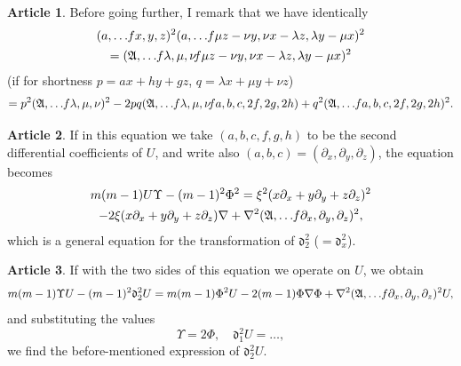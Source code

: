\documentclass[12pt,a4paper]{article}
\theoremstyle{definition}
\newtheorem{art}{Article}[section]
\begin{document}
\begin{art}
Before going further, I remark that we have identically
\begin{multline*}
(a, \ldots \hspace{-2pt} fx, y, z)^2(a, \ldots \hspace{-2pt} f\mu z - \nu y, \nu x - \lambda z, \lambda y - \mu x)^2 \\
= (\mathfrak{A}, \ldots \hspace{-2pt} f\lambda, \mu, \nu \hspace{-2pt} f\mu z - \nu y, \nu x - \lambda z, \lambda y - \mu x)^2
\end{multline*}
(if for shortness $p = ax + hy + gz$, $q = \lambda x + \mu y + \nu z$)
\[
= p^2(\mathfrak{A}, \ldots \hspace{-2pt} f\lambda, \mu, \nu)^2 - 2pq(\mathfrak{A}, \ldots \hspace{-2pt} f\lambda, \mu, \nu \hspace{-2pt} fa, b, c, 2f, 2g, 2h) + q^2(\mathfrak{A}, \ldots \hspace{-2pt} fa, b, c, 2f, 2g, 2h)^2.
\]
\end{art}

\begin{art}
If in this equation we take $(a, b, c, f, g, h)$ to be the second differential coefficients of $U$, and write also $(a, b, c) = (\partial_x, \partial_y, \partial_z)$, the equation becomes
\begin{multline*}
m(m - 1)U\Upsilon - (m - 1)^2\Phi^2 = \xi^2(x\partial_x + y\partial_y + z\partial_z)^2 \\
- 2\xi(x\partial_x + y\partial_y + z\partial_z)\nabla + \nabla^2(\mathfrak{A}, \ldots \hspace{-2pt} f\partial_x, \partial_y, \partial_z)^2,
\end{multline*}
which is a general equation for the transformation of $\mathfrak{d}_2^2$ ($= \mathfrak{d}_x^2$).
\end{art}

\begin{art}
If with the two sides of this equation we operate on $U$, we obtain
\[
m(m - 1)\Upsilon U - (m - 1)^2\mathfrak{d}_2^2 U = m(m - 1)\Phi^2 U - 2(m - 1)\Phi\nabla\Phi + \nabla^2(\mathfrak{A}, \ldots \hspace{-2pt} f\partial_x, \partial_y, \partial_z)^2 U,
\]
and substituting the values
\[
\Upsilon = 2\Phi, \quad \mathfrak{d}_1^2 U = \ldots,
\]
we find the before-mentioned expression of $\mathfrak{d}_2^2 U$.
\end{art}
\end{document}
